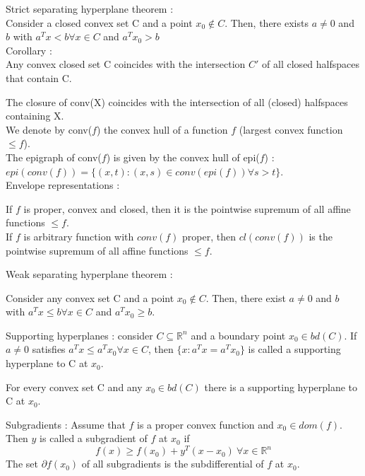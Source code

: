 \documentclass[../main.tex]{subfiles}
\begin{document}
\begin{theorem}
Strict separating hyperplane theorem : \\
    Consider a closed convex set C and a point $x_0 \notin C$. Then, there exists $a \neq 0$ and $b$ with $a^Tx<b \forall x \in C$ and $a^T x_0 > b$\\

    Corollary : \\
    Any convex closed set C coincides with the intersection $C'$ of all closed halfspaces that contain C.
\end{theorem}

The closure of conv(X) coincides with the intersection of all (closed) halfspaces containing X.\\

We denote by conv($f$) the convex hull of a function $f$ (largest convex function $\leq f$).\\
The epigraph of conv($f$) is given by the convex hull of epi($f$) : $epi(conv(f)) = \{(x,t) : (x,s) \in conv(epi(f)) \forall s>t\}$.\\

Envelope representations :
\begin{theorem}
    If $f$ is proper, convex and closed, then it is the pointwise supremum of all affine functions $\leq f$.\\

    If $f$ is arbitrary function with $conv(f)$ proper, then $cl(conv(f))$ is the pointwise supremum of all affine functions $\leq f$.
\end{theorem}

Weak separating hyperplane theorem : \begin{theorem}
    Consider any convex set C and a point $x_0 \notin C$. Then, there exist $a \neq 0$ and $b$ with $a^T x \leq b \forall x \in C$ and $a^T x_0 \geq b$.
\end{theorem}

Supporting hyperplanes : consider $C \subseteq \mathbb{R}^n$ and a boundary point $x_0 \in bd(C)$. If $a \neq 0$ satisfies $a^T x \leq a^T x_0 \forall x \in C$, then $\{x : a^Tx = a^T x_0\}$ is called a supporting hyperplane to C at $x_0$.\\

\begin{theorem}
    For every convex set C and any $x_0 \in bd(C)$ there is a supporting hyperplane to C at $x_0$.
\end{theorem}

Subgradients : Assume that $f$ is a proper convex function and $x_0 \in dom(f)$. Then $y$ is called a subgradient of $f$ at $x_0$ if \begin{equation}
    f(x) \geq f(x_0) + y^T(x-x_0) \: \forall x \in \mathbb{R}^n
\end{equation}
The set $\partial f(x_0)$ of all subgradients is the subdifferential of $f$ at $x_0$.\\
\end{document}
